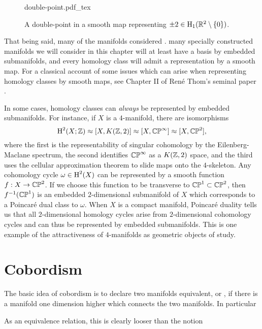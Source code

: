 \begin{figure}[ht]
	\centering
	{double-point.pdf_tex}
	\caption{A double-point in a smooth map representing $\pm 2\in \operatorname{H}_1(\mathbb{R}^2\setminus\{0\})$.}\label{fig:double-point}
\end{figure}

That being said, many of the manifolds considered .
many specially constructed manifolds we will consider in this chapter will at least have a basis by embedded submanifolds, and every homology class will admit a representation by a smooth map. For a classical account of some issues which can arise when representing homology classes by smooth maps, see Chapter II of Ren\'e Thom's seminal paper \cite{thom1954}.

\begin{remark}
	In some cases, homology classes can \emph{always} be represented by embedded submanifolds. For instance, if $X$ is a $4$-manifold, there are isomorphisms
	\[
		\operatorname{H}^2(X; \mathbb{Z}) \approx [X, K(\mathbb{Z},2)] \approx [X, \mathbb{CP}^\infty] \approx [X,\mathbb{CP}^2],
	\]
	where the first is the representability of singular cohomology by the Eilenberg-Maclane spectrum, the second identifies $\mathbb{CP}^\infty$ as a $K(\mathbb{Z},2)$ space, and the third uses the cellular approximation theorem to slide maps onto the $4$-skeleton. Any cohomology cycle $\omega\in \operatorname{H}^2(X)$ can be represented by a smooth function $f : X \to \mathbb{CP}^2$. If we choose this function to be transverse to $\mathbb{CP}^1\subset \mathbb{CP}^2$, then $f^{-1}(\mathbb{CP}^1)$ is an embedded $2$-dimensional submanifold of $X$ which corresponds to a Poincar\'e dual class to $\omega$. When $X$ is a compact manifold, Poincar\'e duality tells us that all $2$-dimensional homology cycles arise from $2$-dimensional cohomology cycles and can thus be represented by embedded submanifolds. This is one example of the attractiveness of $4$-manifolds as geometric objects of study.
\end{remark}

\section{Cobordism}\label{sec:cobordism}

The basic idea of cobordism is to declare two manifolds equivalent, or , if there is a manifold one dimension higher which connects the two manifolds. In particular 

As an equivalence relation, this is clearly looser than the notion 

